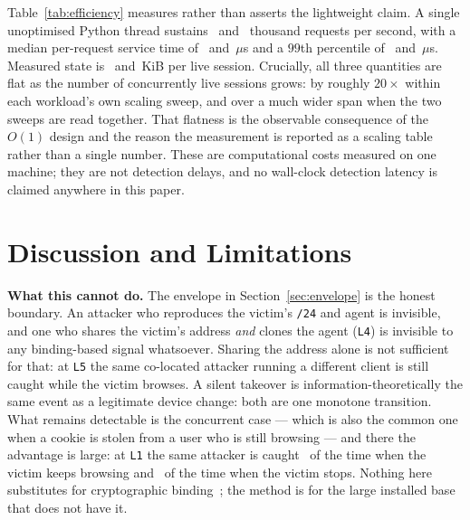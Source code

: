 \documentclass[conference]{IEEEtran}
\begin{document}
Table~\ref{tab:efficiency} measures rather than asserts the lightweight claim.
A single unoptimised Python thread sustains \tputWeb\ and \tputApt\ thousand
requests per second, with a median per-request service time of \usMedWeb\ and
\usMedApt\,$\mu$s and a $99$th percentile of \usPnnWeb\ and \usPnnApt\,$\mu$s.
Measured state is \stateKBWeb\ and \stateKBApt\,KiB per live session.  Crucially,
all three quantities are flat as the number of concurrently live sessions grows:
by roughly $20\times$ within each workload's own scaling sweep, and over a much
wider span when the two sweeps are read together.  That flatness is the
observable consequence of the $O(1)$ design and the reason the measurement is
reported as a scaling table rather than a single number.  These are computational
costs measured on one machine; they are not detection delays, and no wall-clock
detection latency is claimed anywhere in this paper.

\section{Discussion and Limitations}

\noindent\textbf{What this cannot do.}  The envelope in
Section~\ref{sec:envelope} is the honest boundary.  An attacker who reproduces
the victim's \texttt{/24} and agent is invisible, and one who shares the victim's
address \emph{and} clones the agent (\texttt{L4}) is invisible to any
binding-based signal whatsoever.  Sharing the address alone is not sufficient for
that: at \texttt{L5} the same co-located attacker running a different client is
still caught while the victim browses.  A silent takeover is
information-theoretically the same event as a legitimate device change: both are
one monotone transition.  What remains detectable is the concurrent case --- which is also the common one
when a cookie is stolen from a user who is still browsing --- and there the
advantage is large: at \texttt{L1} the same attacker is caught
\recLoneConcurrentWeb\ of the time when the victim keeps browsing and
\recLoneTakeoverWeb\ of the time when the victim stops.  Nothing here substitutes for cryptographic
binding~\cite{rfc8471,rfc9449}; the method is for the large installed base that
does not have it.
\end{document}
